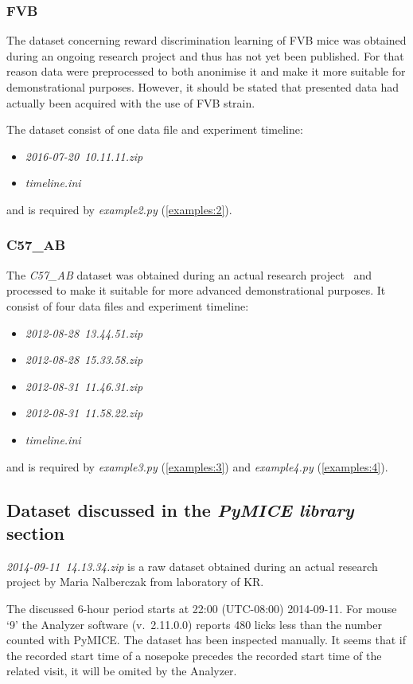 \subsubsection{FVB}
\label{data:examples:fvb}
The dataset concerning reward discrimination learning of FVB mice was obtained
during an ongoing research project and thus has not yet been published. For
that reason data were preprocessed to both anonimise it and make it more
suitable for demonstrational purposes. However, it should be stated that
presented data had actually been acquired with the use of FVB strain.

The dataset consist of one data file
and experiment timeline:
\begin{itemize}
\item \emph{2016-07-20~10.11.11.zip}
\item \emph{timeline.ini}
\end{itemize}
and is required by \emph{example2.py} (\ref{examples:2}).


\subsubsection{C57\_AB}
\label{data:examples:c57}
The \emph{C57\_AB} dataset was obtained during an actual research
project~\cite{Puscian:2014cu} and processed to make it suitable for more advanced
demonstrational purposes. It consist of four data files and experiment
timeline:
\begin{itemize}
\item \emph{2012-08-28~13.44.51.zip}
\item \emph{2012-08-28~15.33.58.zip}
\item \emph{2012-08-31~11.46.31.zip}
\item \emph{2012-08-31~11.58.22.zip}
\item \emph{timeline.ini}
\end{itemize}
and is required by 
\emph{example3.py} (\ref{examples:3}) and
\emph{example4.py} (\ref{examples:4}).


\subsection{Dataset discussed in the \emph{PyMICE library} section}
\emph{2014-09-11~14.13.34.zip} is a raw dataset obtained during an actual
research project by Maria Nalberczak from laboratory of KR.

The discussed 6-hour period starts at 22:00 (\mbox{UTC-08:00})
\mbox{2014-09-11}.
For mouse `9' the Analyzer software (v.~2.11.0.0) reports 480 licks less
than the number counted with PyMICE. The dataset has been inspected
manually. It seems that if the recorded start time of a nosepoke precedes the
recorded start time of the related visit, it will be omited by the Analyzer.

